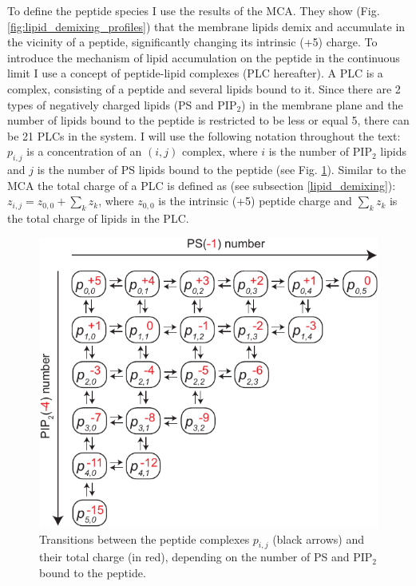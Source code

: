 To define the peptide species I use the results of the MCA. They show (Fig. \ref{fig:lipid_demixing_profiles}) that the membrane lipids demix and accumulate in the vicinity of a peptide, significantly changing its intrinsic (+5) charge. To introduce the mechanism of lipid accumulation on the peptide in the continuous limit I use a concept of peptide-lipid complexes (PLC hereafter). A PLC is a complex, consisting of a peptide and several lipids bound to it. Since there are 2 types of negatively charged lipids (PS and PIP$_2$) in the membrane plane and the number of lipids bound to the peptide is restricted to be less or equal 5, there can be 21 PLCs  in the system. I will use the following notation throughout the text: $p_{i,j}$ is a concentration of an $(i,j)$ complex, where $i$ is the number of PIP$_2$ lipids and $j$ is the number of PS lipids bound to the peptide (see Fig. \ref{fig:peptide_complexes}). Similar to the MCA the total charge of a PLC is defined as (see subsection \ref{lipid_demixing}): $z_{i,j} = z_{0,0} + \sum_k z_k$, where $z_{0,0}$ is the intrinsic (+5) peptide charge and $\sum_k z_k$ is the total charge of lipids in the PLC.
\begin{figure}[!ht]
\begin{center}
 \includegraphics{../figures/peptide_complexes.pdf}
\end{center}
\caption[Transitions between PLCs]{Transitions between the peptide complexes $p_{i,j}$ (black arrows) and their total charge (in red), depending on the number of PS and PIP$_2$ bound to the peptide.}
\label{fig:peptide_complexes}
\end{figure}

